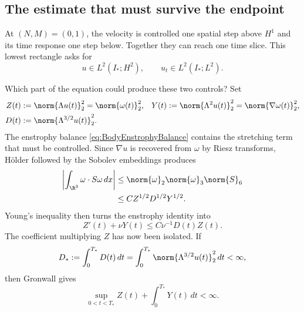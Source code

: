 \subsection{The estimate that must survive the endpoint}\label{sub:BodyCompatibleIntersection}

At \((N,M)=(0,1)\), the velocity is controlled one spatial step above \(H^1\)
and its time response one step below.  Together they can reach one time slice.
This lowest rectangle asks for
\begin{equation}\label{eq:BodyFirstWholeTerminalRectangle}
  u\in L^2(I_*;H^2),
  \qquad
  u_t\in L^2(I_*;L^2).
\end{equation}

Which part of the equation could produce these two controls?  Set
\begin{equation}\label{eq:BodyEnstrophyDissipationQuantities}
\begin{aligned}
  Z(t)&:=\norm{\Lambda u(t)}_2^2=\norm{\omega(t)}_2^2,
  &
  Y(t)&:=\norm{\Lambda^2u(t)}_2^2=\norm{\nabla\omega(t)}_2^2,
  \\
  D(t)&:=\norm{\Lambda^{3/2}u(t)}_2^2.
\end{aligned}
\end{equation}
The enstrophy balance \eqref{eq:BodyEnstrophyBalance} contains the stretching
term that must be controlled.  Since \(\nabla u\) is recovered from \(\omega\)
by Riesz transforms, H\"older followed by the Sobolev embeddings produces
\begin{align}
  \left|\int_{\R^3}\omega\cdot S\omega\,dx\right|
  &\leq
  \norm{\omega}_2\norm{\omega}_3\norm{S}_6
  \notag\\
  &\leq C Z^{1/2}D^{1/2}Y^{1/2}.
  \label{eq:BodyFirstRectangleStretchingEstimate}
\end{align}
Young's inequality then turns the enstrophy identity into
\begin{equation}\label{eq:BodyEnstrophyFromCriticalDissipation}
  Z'(t)+\nu Y(t)
  \leq C\nu^{-1}D(t)Z(t).
\end{equation}
The coefficient multiplying \(Z\) has now been isolated.  If
\begin{equation}\label{eq:BodyCriticalDissipationInterface}
  D_*:=\int_0^{T_*}D(t)\,dt
  =\int_0^{T_*}\norm{\Lambda^{3/2}u(t)}_2^2\,dt
  <\infty,
\end{equation}
then Gronwall gives
\begin{equation}\label{eq:BodyEnstrophyAndHtwoFromDissipation}
  \sup_{0<t<T_*}Z(t)+\int_0^{T_*}Y(t)\,dt<\infty.
\end{equation}
